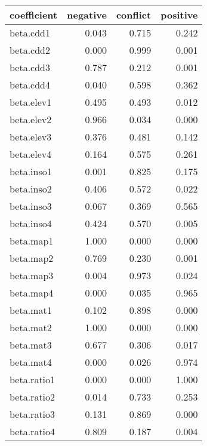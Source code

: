 \begin{table}[ht]
\centering
\begin{tabular}{lrrr}
  \hline
coefficient & negative & conflict & positive \\ 
  \hline
beta.cdd1 & 0.043 & 0.715 & 0.242 \\ 
  beta.cdd2 & 0.000 & 0.999 & 0.001 \\ 
  beta.cdd3 & 0.787 & 0.212 & 0.001 \\ 
  beta.cdd4 & 0.040 & 0.598 & 0.362 \\ 
  beta.elev1 & 0.495 & 0.493 & 0.012 \\ 
  beta.elev2 & 0.966 & 0.034 & 0.000 \\ 
  beta.elev3 & 0.376 & 0.481 & 0.142 \\ 
  beta.elev4 & 0.164 & 0.575 & 0.261 \\ 
  beta.inso1 & 0.001 & 0.825 & 0.175 \\ 
  beta.inso2 & 0.406 & 0.572 & 0.022 \\ 
  beta.inso3 & 0.067 & 0.369 & 0.565 \\ 
  beta.inso4 & 0.424 & 0.570 & 0.005 \\ 
  beta.map1 & 1.000 & 0.000 & 0.000 \\ 
  beta.map2 & 0.769 & 0.230 & 0.001 \\ 
  beta.map3 & 0.004 & 0.973 & 0.024 \\ 
  beta.map4 & 0.000 & 0.035 & 0.965 \\ 
  beta.mat1 & 0.102 & 0.898 & 0.000 \\ 
  beta.mat2 & 1.000 & 0.000 & 0.000 \\ 
  beta.mat3 & 0.677 & 0.306 & 0.017 \\ 
  beta.mat4 & 0.000 & 0.026 & 0.974 \\ 
  beta.ratio1 & 0.000 & 0.000 & 1.000 \\ 
  beta.ratio2 & 0.014 & 0.733 & 0.253 \\ 
  beta.ratio3 & 0.131 & 0.869 & 0.000 \\ 
  beta.ratio4 & 0.809 & 0.187 & 0.004 \\ 
   \hline
\end{tabular}
\end{table}
